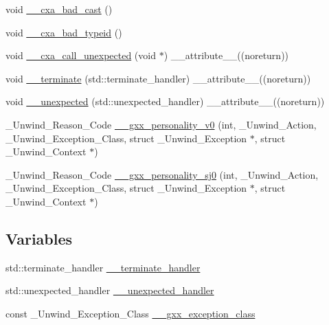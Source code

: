 \begin{DoxyCompactItemize}
\item 
void \hyperlink{namespace____cxxabiv1_aa9458fba4be0ba058e92e1edef17795d}{\-\_\-\-\_\-cxa\-\_\-bad\-\_\-cast} ()
\item 
void \hyperlink{namespace____cxxabiv1_a9bf53abfb101b3b910debe88f2d60711}{\-\_\-\-\_\-cxa\-\_\-bad\-\_\-typeid} ()
\item 
void \hyperlink{namespace____cxxabiv1_a78b2cf246910df85e52f4c285e23acf1}{\-\_\-\-\_\-cxa\-\_\-call\-\_\-unexpected} (void $\ast$) \-\_\-\-\_\-attribute\-\_\-\-\_\-((noreturn))
\item 
void \hyperlink{namespace____cxxabiv1_a072cc5e0906483f9e3b729b8d8e05843}{\-\_\-\-\_\-terminate} (std\-::terminate\-\_\-handler) \-\_\-\-\_\-attribute\-\_\-\-\_\-((noreturn))
\item 
void \hyperlink{namespace____cxxabiv1_a7ae848cfeb6c720e8924f78ee301a7af}{\-\_\-\-\_\-unexpected} (std\-::unexpected\-\_\-handler) \-\_\-\-\_\-attribute\-\_\-\-\_\-((noreturn))
\item 
\-\_\-\-Unwind\-\_\-\-Reason\-\_\-\-Code \hyperlink{namespace____cxxabiv1_addf73d016a9a97786edceb50a6915109}{\-\_\-\-\_\-gxx\-\_\-personality\-\_\-v0} (int, \-\_\-\-Unwind\-\_\-\-Action, \-\_\-\-Unwind\-\_\-\-Exception\-\_\-\-Class, struct \-\_\-\-Unwind\-\_\-\-Exception $\ast$, struct \-\_\-\-Unwind\-\_\-\-Context $\ast$)
\item 
\-\_\-\-Unwind\-\_\-\-Reason\-\_\-\-Code \hyperlink{namespace____cxxabiv1_a2c5fdee37427781baf9669f4ba4c5f25}{\-\_\-\-\_\-gxx\-\_\-personality\-\_\-sj0} (int, \-\_\-\-Unwind\-\_\-\-Action, \-\_\-\-Unwind\-\_\-\-Exception\-\_\-\-Class, struct \-\_\-\-Unwind\-\_\-\-Exception $\ast$, struct \-\_\-\-Unwind\-\_\-\-Context $\ast$)
\end{DoxyCompactItemize}
\subsection*{Variables}
\begin{DoxyCompactItemize}
\item 
std\-::terminate\-\_\-handler \hyperlink{namespace____cxxabiv1_a0128b535d39d6d6df146d8675585a634}{\-\_\-\-\_\-terminate\-\_\-handler}
\item 
std\-::unexpected\-\_\-handler \hyperlink{namespace____cxxabiv1_a47e07d381357c2eb2b92436d7ff86f4b}{\-\_\-\-\_\-unexpected\-\_\-handler}
\item 
const \-\_\-\-Unwind\-\_\-\-Exception\-\_\-\-Class \hyperlink{namespace____cxxabiv1_a80b0f73d26cf8434d330a3a578862519}{\-\_\-\-\_\-gxx\-\_\-exception\-\_\-class}
\end{DoxyCompactItemize}



